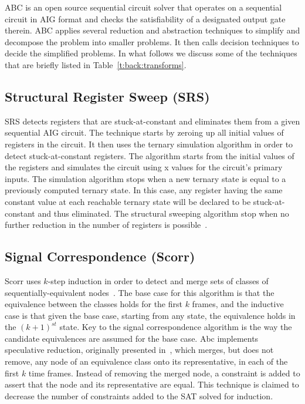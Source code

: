 ABC is an open source sequential circuit solver that operates 
on a sequential circuit in AIG format and checks the satisfiability 
of a designated output gate therein. 
ABC applies several reduction and abstraction
techniques to simplify and decompose the problem into smaller problems. 
It then calls decision techniques to decide the simplified problems. 
In what follows we discuss some of the techniques that are briefly 
listed in Table~\ref{t:back:transforms}. 

\subsection{Structural Register Sweep (SRS)}
SRS detects registers that are stuck-at-constant and eliminates 
them from a given sequential AIG circuit. The technique starts by zeroing up all 
initial values of registers in the circuit. It then uses the ternary simulation
algorithm in order to detect stuck-at-constant registers. The algorithm starts from 
the initial values of the registers and simulates the circuit using x values for the
circuit's primary inputs. The simulation algorithm stops when a new ternary state is 
equal to a previously computed ternary state. In this case, any register having the 
same constant value at each reachable ternary state will be declared to be 
stuck-at-constant and thus eliminated. The structural sweeping algorithm stop when 
no further reduction in the number of registers is possible~\cite{mishchenko2008scalable}. 

\subsection{Signal Correspondence (Scorr)} 
Scorr uses $k$-step induction in order to detect and merge sets of classes of 
sequentially-equivalent nodes~\cite{mishchenko2008scalable}. The base case for this algorithm is that the equivalence
between the classes holds for the first $k$ frames, and the inductive case is that 
given the base case, starting from any state, the equivalence holds in the 
$(k+1)^{st}$ state. Key to the signal correspondence algorithm is the way the candidate
equivalences are assumed for the base case. Abc implements speculative reduction, 
originally presented in~\cite{mony2005exploiting}, which merges, but does not remove, any node of an equivalence 
class onto its representative, in each of the first $k$ time frames. Instead of removing the 
merged node, a constraint is added to assert that the node and its representative are equal. 
This technique is claimed to decrease the number of constraints added to the SAT solved for 
induction. 

